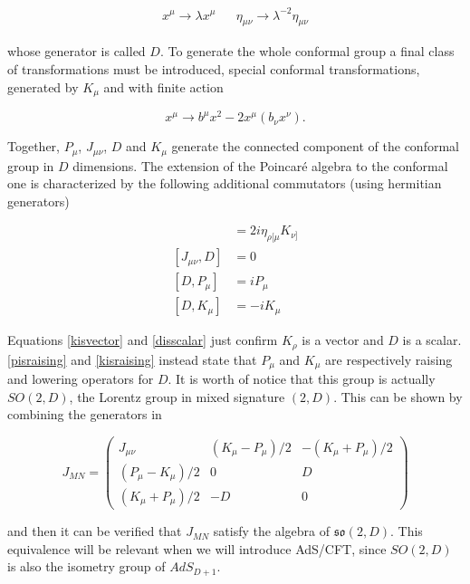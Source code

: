 \begin{align}
	x^\mu \rightarrow \lambda x^\mu && \eta_{\mu\nu} \rightarrow \lambda^{-2} \eta_{\mu\nu}
	\label{}
\end{align}

whose generator is called $D$. To generate the whole conformal group a final class of transformations must be introduced, special conformal transformations, generated by $K_\mu$ and with finite action

\begin{equation}
	x^\mu \rightarrow b^\mu x^2 - 2x^\mu (b_\nu x^\nu).
	\label{}
\end{equation}

Together, $P_\mu$, $J_{\mu\nu}$, $D$ and $K_\mu$ generate the connected component of the conformal group in $D$ dimensions. The extension of the Poincar\'e algebra to the conformal one is characterized by the following additional commutators (using hermitian generators)

\begin{align}
	[J_{\mu\nu},K_\rho] 	&= 2i \eta_{\rho[\mu} K_{\nu]}	\label{kisvector}\\
	[J_{\mu\nu},D] 		&= 0 				\label{disscalar}\\
	[D, P_\mu] 		&= i P_\mu 			\label{pisraising}\\
	[D, K_\mu] 		&= -i K_\mu			\label{kisraising}
\end{align}

Equations \eqref{kisvector} and \eqref{disscalar} just confirm $K_\rho$ is a vector and $D$ is a scalar. \eqref{pisraising} and \eqref{kisraising} instead state that $P_\mu$ and $K_\mu$ are respectively raising and lowering operators for $D$. It is worth of notice that this group is actually $SO(2,D)$, the Lorentz group in mixed signature $(2,D)$. This can be shown by combining the generators in

\begin{equation}
	J_{MN} = 
	\begin{pmatrix}
		J_{\mu\nu} 		& (K_\mu - P_\mu)/2	& - (K_\mu+P_\mu)/2 \\
		(P_\mu - K_\mu)/2	& 0			& D \\
		(K_\mu+P_\mu)/2		& -D			& 0
	\end{pmatrix}
	\label{}
\end{equation}

and then it can be verified that $J_{MN}$ satisfy the algebra of $\mathfrak{so}(2,D)$. This equivalence will be relevant when we will introduce AdS/CFT, since $SO(2,D)$ is also the isometry group of $AdS_{D+1}$.

